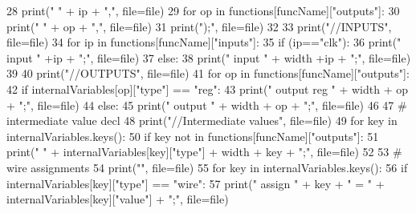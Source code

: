 \begin{DoxyCode}
28             print(\textcolor{stringliteral}{"    "} + ip + \textcolor{stringliteral}{","}, file=file)
29         \textcolor{keywordflow}{for} op \textcolor{keywordflow}{in} functions[funcName][\textcolor{stringliteral}{"outputs"}]:
30             print(\textcolor{stringliteral}{"    "} + op + \textcolor{stringliteral}{","}, file=file)
31         print(\textcolor{stringliteral}{");"}, file=file)
32 
33         print(\textcolor{stringliteral}{"//INPUTS"}, file=file)
34         \textcolor{keywordflow}{for} ip \textcolor{keywordflow}{in} functions[funcName][\textcolor{stringliteral}{"inputs"}]:
35             \textcolor{keywordflow}{if} (ip==\textcolor{stringliteral}{"clk"}):
36                 print(\textcolor{stringliteral}{"    input "} +ip + \textcolor{stringliteral}{";"}, file=file)
37             \textcolor{keywordflow}{else}:
38                 print(\textcolor{stringliteral}{"    input "} + width +ip + \textcolor{stringliteral}{";"}, file=file)
39 
40         print(\textcolor{stringliteral}{"//OUTPUTS"}, file=file)
41         \textcolor{keywordflow}{for} op \textcolor{keywordflow}{in} functions[funcName][\textcolor{stringliteral}{"outputs"}]:
42             \textcolor{keywordflow}{if} internalVariables[op][\textcolor{stringliteral}{"type"}] == \textcolor{stringliteral}{"reg"}:
43                 print(\textcolor{stringliteral}{"    output reg "} + width + op + \textcolor{stringliteral}{";"}, file=file)
44             \textcolor{keywordflow}{else}:
45                 print(\textcolor{stringliteral}{"    output "} + width + op + \textcolor{stringliteral}{";"}, file=file)
46 
47         \textcolor{comment}{# intermediate value decl
}
48         print(\textcolor{stringliteral}{"//Intermediate values"}, file=file)
49         \textcolor{keywordflow}{for} key \textcolor{keywordflow}{in} internalVariables.keys():
50             \textcolor{keywordflow}{if} key \textcolor{keywordflow}{not} \textcolor{keywordflow}{in} functions[funcName][\textcolor{stringliteral}{"outputs"}]:
51                 print(\textcolor{stringliteral}{"    "} + internalVariables[key][\textcolor{stringliteral}{"type"}] + width + key + \textcolor{stringliteral}{";"}, file=file)
52 
53         \textcolor{comment}{# wire assignments
}
54         print(\textcolor{stringliteral}{""}, file=file)
55         \textcolor{keywordflow}{for} key \textcolor{keywordflow}{in} internalVariables.keys():
56             \textcolor{keywordflow}{if} internalVariables[key][\textcolor{stringliteral}{"type"}] == \textcolor{stringliteral}{"wire"}:
57                 print(\textcolor{stringliteral}{"    assign "} + key + \textcolor{stringliteral}{" = "} + internalVariables[key][\textcolor{stringliteral}{"value"}] + \textcolor{stringliteral}{";"}, file=file)

\end{DoxyCode}
